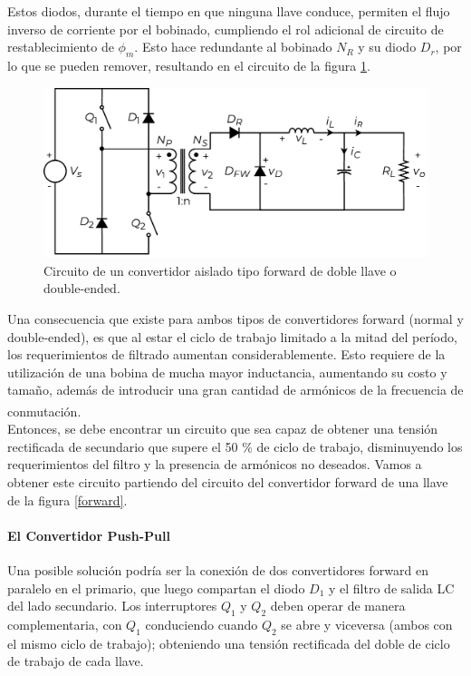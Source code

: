 Estos diodos, durante el tiempo en que ninguna llave conduce, permiten el flujo inverso de corriente por el bobinado, cumpliendo el rol adicional de circuito de restablecimiento de $\phi_m$. Esto hace redundante al bobinado $N_R$ y su diodo $D_r$, por lo que se pueden remover, resultando en el circuito de la figura \ref{forward_doubleended}.\\

\begin{figure}[h]
    \centering
    \includegraphics[scale=0.6]{Imagenes/Forward Double-Ended.pdf}
    \caption{Circuito de un convertidor aislado tipo forward de doble llave o double-ended.}
    \label{forward_doubleended}
\end{figure}

Una consecuencia que existe para ambos tipos de convertidores forward (normal y double-ended), es que al estar el ciclo de trabajo limitado a la mitad del período, los requerimientos de filtrado aumentan considerablemente. Esto requiere de la utilización de una bobina de mucha mayor inductancia, aumentando su costo y tamaño, además de introducir una gran cantidad de armónicos de la frecuencia de conmutación.\textsuperscript{\cite{SoftSwitchPWM}}\\

Entonces, se debe encontrar un circuito que sea capaz de obtener una tensión rectificada de secundario que supere el 50 \% de ciclo de trabajo, disminuyendo los requerimientos del filtro y la presencia de armónicos no deseados. Vamos a obtener este circuito partiendo del circuito del convertidor forward de una llave de la figura \ref{forward}.\\

\paragraph{El Convertidor Push-Pull}

Una posible solución podría ser la conexión de dos convertidores forward en paralelo en el primario, que luego compartan el diodo $D_1$ y el filtro de salida LC del lado secundario. Los interruptores $Q_1$ y $Q_2$ deben operar de manera complementaria, con $Q_1$ conduciendo cuando $Q_2$ se abre y viceversa (ambos con el mismo ciclo de trabajo); obteniendo una tensión rectificada del doble de ciclo de trabajo de cada llave.\\

